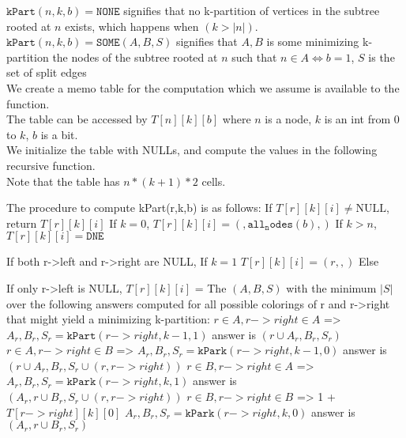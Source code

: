 \documentclass[11pt]{article}
\begin{document}
$\mathtt{kPart}(n,k,b) = \mathtt{NONE}$ signifies that no k-partition of vertices in the subtree rooted at $n$ exists, which happens when $(k > |n|)$. \\
$\mathtt{kPart}(n,k,b) = \mathtt{SOME}(A,B,S)$ signifies that $A,B$ is some minimizing k-partition the nodes of the subtree rooted at $n$ such that $n \in A \iff b = 1$, $S$ is the set of split edges\\


We create a memo table for the computation which we assume is available to the function.\\
The table can be accessed by $T[n][k][b]$ where $n$ is a node, $k$ is an int from 0 to $k$, $b$ is a bit.\\
We initialize the table with NULLs, and compute the values in the following recursive function.\\
Note that the table has $n*(k+1)*2$ cells.

The procedure to compute kPart(r,k,b) is as follows:
    If $T[r][k][i] \neq \text{NULL}$,
       return $T[r][k][i]$
    If $k = 0$,
       $T[r][k][i] = ({}, {\mathtt{all_nodes}(b)}, {})$
    If $k > n$,
       $T[r][k][i] = \mathtt{DNE}$

    If both r->left and r->right are NULL,
        If $k=1$
            $T[r][k][i] = ({r}, {}, {})$
        Else

    If only r->left is NULL,
        $T[r][k][i]$ = The $(A,B,S)$ with the minimum $|S|$ over the following answers computed for all possible colorings of r and r->right that might yield a minimizing k-partition:
          $r \in A, r->right \in A$ =>
            $A_r, B_r, S_r = \mathtt{kPart}(r->right,k-1,1)$
            answer is $({r} \cup A_r, B_r, S_r)$
          $r \in A, r->right \in B$ =>
            $A_r, B_r, S_r = \mathtt{kPark}(r->right,k-1,0)$
            answer is $({r} \cup A_r, B_r, S_r \cup {(r, r->right)})$
          $r \in B, r->right \in A$ =>
            $A_r, B_r, S_r = \mathtt{kPark}(r->right,k,1)$
            answer is $(A_r,{r} \cup B_r, S_r \cup {(r, r->right)})$
          $r \in B, r->right \in B$ => 1 + $T[r->right][k][0]$
            $A_r, B_r, S_r = \mathtt{kPark}(r->right,k,0)$
            answer is $(A_r,{r} \cup B_r, S_r)$
\end{document}
